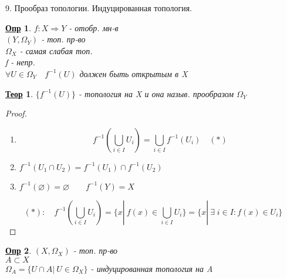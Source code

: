 \documentclass[12pt, fleqn]{article}
\newenvironment{question}[1]{\hspace*{-4em} #1}{\newpage}
\newcommand{\ra}{\Rightarrow}
\newcommand{\q}{\quad}
\theoremstyle{nonumbermarginbreak}
\newtheorem{theorem}{\hspace*{-2em}\underline{\bfseries Теор}}[section]
\newtheorem{definition}{\hspace*{-2em}\underline{\bfseries Опр}}[section]
\newtheorem{proof}{\hspace*{-2em}\underline{\bfseries Док-во}}[section]
\begin{document}
    \begin{question}{9. Прообраз топологии. Индуцированная топология.}
        \begin{definition} 
            $f: X \ra Y$ - отобр. мн-в\\
            $(Y, \Omega_Y)$ - топ. пр-во\\
            $\Omega_X$ - самая слабая топ.\\
            f - непр.\\
            $\forall U \in \Omega_Y \q f^{-1}(U)$ должен быть открытым в X
        \end{definition}
        \begin{theorem} 
            $\{f^{-1}(U)\}$ - топология на X и она назыв. прообразом $\Omega_Y$
        \end{theorem}

        \begin{proof} 
            \begin{enumerate}
                \item \[f^{-1}(\bigcup_{i \in I} U_i) = \bigcup_{i \in I} f^{-1}(U_i) \q (*)\]
                \item $f^{-1}(U_1 \cap U_2) = f^{-1}(U_1) \cap f^{-1}(U_2)$
                \item $f^{-1}(\varnothing) = \varnothing \q\q f^{-1}(Y) = X$
            \end{enumerate}
            \[(*): \q f^{-1}(\bigcup_{i \in I} U_i) = \{x | \ f(x) \in \bigcup_{i \in I} U_i\} = 
            \{x | \ \exists \; i \in I: f(x) \in U_i\}\]
        \end{proof}

        \begin{definition} 
            $(X, \Omega_X)$ - топ. пр-во\\
            $A \subset X$\\
            $\Omega_A = \{U \cap A | \ U \in \Omega_X\}$ - индуцированная топология на A
        \end{definition}
    \end{question}
\end{document}
